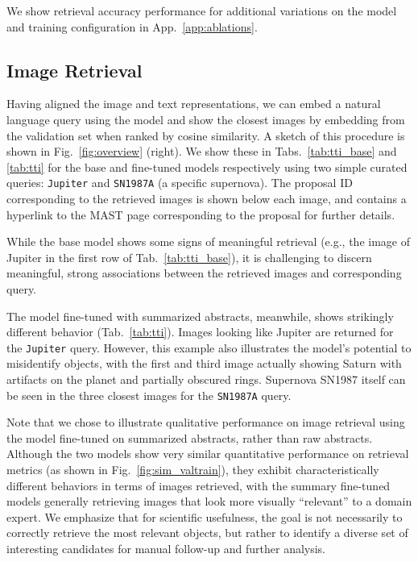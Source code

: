 \documentclass{article} %
\begin{document}
   We show retrieval accuracy performance for additional variations on the model and training configuration in App.~\ref{app:ablations}.
   
   \subsection{Image Retrieval}
   
   Having aligned the image and text representations, we can embed a natural language query using the model and show the closest images by embedding from the validation set when ranked by cosine similarity. A sketch of this procedure is shown in Fig.~\ref{fig:overview} (right).
   We show these in Tabs.~\ref{tab:tti_base} and \ref{tab:tti} for the base and fine-tuned models respectively using two simple curated queries: \texttt{Jupiter} and  \texttt{SN1987A} (a specific supernova). The proposal ID corresponding to the retrieved images is shown below each image, and contains a hyperlink to the MAST page corresponding to the proposal for further details.
   
   While the base model shows some signs of meaningful retrieval (e.g., the image of Jupiter in the first row of Tab.~\ref{tab:tti_base}), it is challenging to discern meaningful, strong associations between the retrieved images and corresponding query.
   
   The model fine-tuned with summarized abstracts, meanwhile, shows strikingly different behavior (Tab.~\ref{tab:tti}).
   Images looking like Jupiter are returned for the \texttt{Jupiter} query. 
   However, this example also illustrates the model's potential to misidentify objects, with the first and third image actually showing Saturn with artifacts on the planet and partially obscured rings.
   Supernova SN1987 itself can be seen in the three closest images for the \texttt{SN1987A} query.  %
   
   Note that we chose to illustrate qualitative performance on image retrieval using the model fine-tuned on summarized abstracts, rather than raw abstracts. 
   Although the two models show very similar quantitative performance on retrieval metrics (as shown in Fig.~\ref{fig:sim_valtrain}), they exhibit characteristically different behaviors in terms of images retrieved, with the summary fine-tuned models generally retrieving images that look more visually ``relevant'' to a domain expert. We emphasize that for scientific usefulness, the goal is not necessarily to correctly retrieve the most relevant objects, but rather to identify a diverse set of interesting candidates for manual follow-up and further analysis.  %
   
\end{document}
